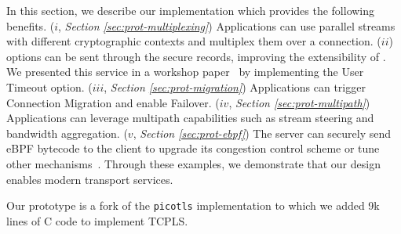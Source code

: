 \label{sec:content}

In this section, we describe our \tcpls implementation which provides the 
following benefits.
($i$, \textit{Section \ref{sec:prot-multiplexing}}) Applications can use 
parallel 
streams with 
different cryptographic 
contexts and multiplex them over a \tcp connection.
($ii$) \tcp options can be sent through the secure \tcpls records, improving 
the extensibility of \tcp. We presented this service in a workshop
paper~\cite{rochet2020tcpls} by implementing the \tcp User Timeout option.
($iii$, \textit{Section \ref{sec:prot-migration}}) Applications can trigger 
Connection Migration and enable Failover.
($iv$, \textit{Section \ref{sec:prot-multipath}}) Applications can leverage 
multipath 
capabilities such as stream 
steering %
and bandwidth aggregation.
($v$, \textit{Section \ref{sec:prot-ebpf}}) The server can securely send eBPF 
bytecode to the client 
to upgrade its \tcp congestion control scheme or tune other \tcp 
mechanisms~\cite{brakmo2017tcp,tran2019beyond}. Through these examples,
we demonstrate that our design enables modern transport services.

Our prototype is a fork of the \texttt{picotls}  implementation 
to which we added 9k lines of C code to implement TCPLS.

